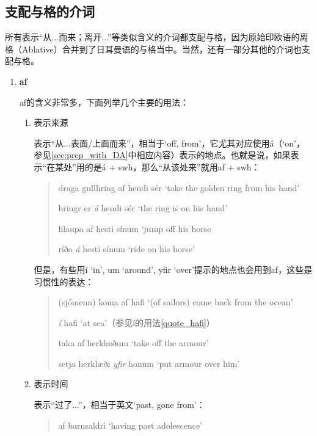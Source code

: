 \subsection{支配与格的介词}
所有表示“从...而来；离开...”等类似含义的介词都支配与格，因为原始印欧语的离格（Ablative）\footnotemark 合并到了日耳曼语的与格当中。当然，还有一部分其他的介词也支配与格。
\begin{enumerate}[itemindent=1em, label=\textbf{\arabic*}.]
    \item \textbf{af}

          af的含义非常多，下面列举几个主要的用法：
          \begin{enumerate}
              \item 表示来源

                    表示“从...表面/上面而来”，相当于`off, from'，它尤其对应使用á（`on'，参见\ref{sec:prep_with_DA}中相应内容）表示的地点。也就是说，如果表示“在某处”用的是á + swh，那么“从该处来”就用af + swh：
                    \begin{quote}
                        draga gullhring af hendi sér `take the golden ring from his hand'

                        \HandRight \quad hringr er \textit{á} hendi sér `the ring is on his hand'

                        hlaupa af hesti sínum `jump off his horse

                        \HandRight \quad ríða \textit{á} hesti sínum `ride on his horse'
                    \end{quote}
                    但是，有些用í `in', um `around', yfir `over'提示的地点也会用到af，这些是习惯性的表达：
                    \begin{quote}
                        (sjómenn) koma af hafi `(of sailors) come back from the ocean'

                        \HandRight \quad \textit{í} hafi `at sea'（参见í的用法\ref{quote_hafi}）

                        taka af herklæðum `take off the armour'

                        \HandRight \quad setja herklæði \textit{yfir} honum `put armour over him'
                    \end{quote}
              \item 表示时间

                    表示“过了...”，相当于英文`past, gone from'：
                    \begin{quote}
                        af barnsaldri `having past adolescence'


\end{quote}
\end{enumerate}
\end{enumerate}
